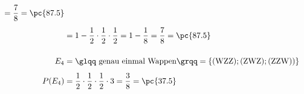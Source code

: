 \begin{exercise}
\begin{equation*}
\begin{split}
        =\frac{7}{8}
        =\pc{87.5}
        \\[1ex]
        &=1-\frac{1}{2}\cdot\frac{1}{2}\cdot\frac{1}{2}
        =1-\frac{1}{8}
        =\frac{7}{8}
        =\pc{87.5}
        \\[3ex]
        E_4&=\text{\glqq genau einmal Wappen\grqq}
        =\{(\text{WZZ});(\text{ZWZ});(\text{ZZW}))\}
        \\[1ex]
        P(E_4)&=\frac{1}{2}\cdot\frac{1}{2}\cdot\frac{1}{2}\cdot3
        =\frac{3}{8}
        =\pc{37.5}
      \end{split}
    \end{equation*}
  \fi
\end{exercise}
